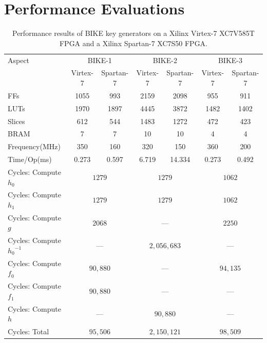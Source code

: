 \documentclass[runningheads]{llncs}
\begin{document}
\section{Performance Evaluations}
\label{sec::evaluation}

\begin{table}[!t]\centering
 \caption{Performance results of BIKE key generators on a Xilinx Virtex-7 XC7V585T FPGA and a Xilinx Spartan-7 XC7S50 FPGA.}
 \label{table:expresult}\centering
 \begin{minipage}{\textwidth}\centering
  \begin{tabular}{lcccccc}
   \hline
   Aspect & \multicolumn{2}{c}{BIKE-1} & \multicolumn{2}{c}{BIKE-2} & \multicolumn{2}{c}{BIKE-3}\\
    & Virtex-7 & Spartan-7  & Virtex-7 & Spartan-7  & Virtex-7 & Spartan-7\\
   \hline
   FFs &1055   &993  &2159 &2098 &955 &911\\
   LUTs & 1970  &1897  &4445 &3872&1482&1402  \\
   Slices& 612 &544  &1483 &1272&472&423  \\
   BRAM & 7  &7  &10 & 10& 4&4\\
   \hline
   Frequency(MHz) &  350    & 160   &320   & 150    & 360   & 200  \\
   Time/Op(ms) &  0.273   &  0.597  & 6.719  & 14.334   &0.273   & 0.492  \\
   \hline
   Cycles: Compute $h_0$ & \multicolumn{2}{c}{$1279$  } & \multicolumn{2}{c}{$1279$  }  & \multicolumn{2}{c}{$1062$  }\\
    Cycles: Compute $h_1$& \multicolumn{2}{c}{$1279$  } & \multicolumn{2}{c}{$1279$  } & \multicolumn{2}{c}{$1062$  }\\
    Cycles: Compute $g$ & \multicolumn{2}{c}{$2068$  } & \multicolumn{2}{c}{---} & \multicolumn{2}{c}{$2250$  }\\
    Cycles: Compute ${h_0}^{-1}$ & \multicolumn{2}{c}{---} & \multicolumn{2}{c}{$2,056,683$  } &\multicolumn{2}{c}{---}\\
    Cycles: Compute $f_0$ & \multicolumn{2}{c}{$90,880$  } & \multicolumn{2}{c}{---} &\multicolumn{2}{c}{$94,135$  }\\
    Cycles: Compute $f_1$ & \multicolumn{2}{c}{$90,880$  }  & \multicolumn{2}{c}{---} &\multicolumn{2}{c}{---}\\
    Cycles: Compute $h$  &  \multicolumn{2}{c}{---}          & \multicolumn{2}{c}{$90,880$  } & \multicolumn{2}{c}{---}\\
   \hline
   Cycles: Total & \multicolumn{2}{c}{$95,506$  } & \multicolumn{2}{c}{$2,150,121$  } & \multicolumn{2}{c}{$98,509$  }\\
   \hline
  \end{tabular}
  \end{minipage}
\vspace{-4mm}
\end{table}
\end{document}
